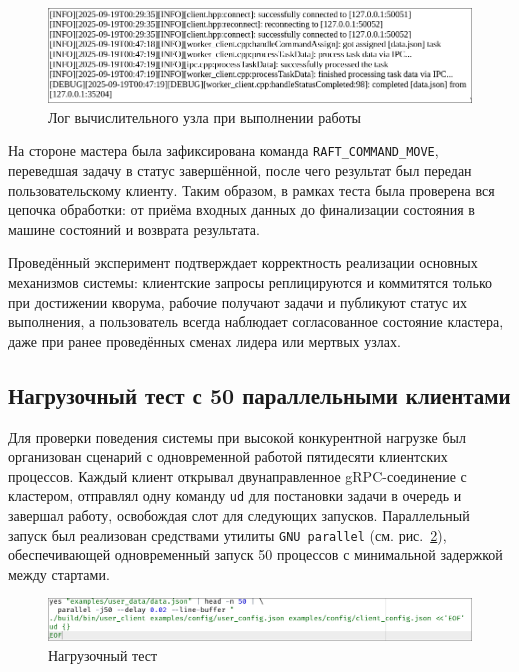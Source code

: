 \begin{figure}[h!]
    \centering
    \includegraphics[width=0.8\linewidth]{inc/worker-log-task.png}
    \caption{Лог вычислительного узла при выполнении работы}
    \label{fig:worker-log-task}
\end{figure}

На стороне мастера была зафиксирована команда \texttt{RAFT\_COMMAND\_MOVE},
переведшая задачу в статус завершённой, после чего результат был передан
пользовательскому клиенту. Таким образом, в рамках теста была проверена вся
цепочка обработки: от приёма входных данных до финализации состояния в машине
состояний и возврата результата.

Проведённый эксперимент подтверждает корректность реализации основных
механизмов системы: клиентские запросы реплицируются и коммитятся только при
достижении кворума, рабочие получают задачи и публикуют статус их выполнения,
а пользователь всегда наблюдает согласованное состояние кластера, даже при
ранее проведённых сменах лидера или мертвых узлах.

\subsection{Нагрузочный тест с 50 параллельными клиентами}

Для проверки поведения системы при высокой конкурентной нагрузке был
организован сценарий с одновременной работой пятидесяти клиентских процессов.
Каждый клиент открывал двунаправленное gRPC-соединение с кластером, отправлял
одну команду \texttt{ud} для постановки задачи в очередь и завершал работу,
освобождая слот для следующих запусков. Параллельный запуск был реализован
средствами утилиты \texttt{GNU parallel} (см. рис.~\ref{fig:leader-multi-conn}),
обеспечивающей одновременный запуск 50 процессов с минимальной задержкой между
стартами.

\begin{figure}[h!]
    \centering
    \includegraphics[width=0.95\linewidth]{inc/load-multi.png}
    \caption{Нагрузочный тест}
    \label{fig:leader-multi-conn}
\end{figure}

